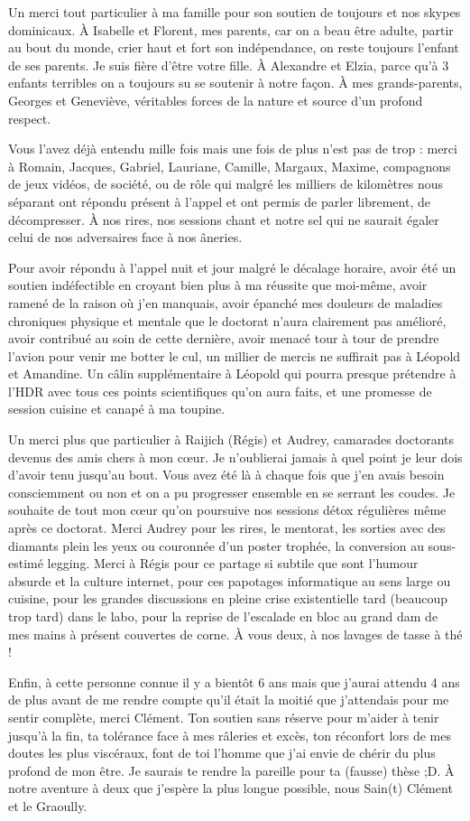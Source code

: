 Un merci tout particulier à ma famille pour son soutien de toujours et nos skypes dominicaux. À Isabelle et Florent, mes parents, car on a beau être adulte, partir au bout du monde, crier haut et fort son indépendance, on reste toujours l'enfant de ses parents. Je suis fière d'être votre fille. À Alexandre et Elzia, parce qu'à 3 enfants terribles on a toujours su se soutenir à notre façon. À mes grands-parents, Georges et Geneviève, véritables forces de la nature et source d'un profond respect.

Vous l'avez déjà entendu mille fois mais une fois de plus n'est pas de trop : merci à Romain, Jacques, Gabriel, Lauriane, Camille, Margaux, Maxime, compagnons de jeux vidéos, de société, ou de rôle qui malgré les milliers de kilomètres nous séparant ont répondu présent à l'appel et ont permis de parler librement, de décompresser. À nos rires, nos sessions chant et notre sel qui ne saurait égaler celui de nos adversaires face à nos âneries.

Pour avoir répondu à l'appel nuit et jour malgré le décalage horaire, avoir été un soutien indéfectible en croyant bien plus à ma réussite que moi-même, avoir ramené de la raison où j'en manquais, avoir épanché mes douleurs de maladies chroniques physique et mentale que le doctorat n'aura clairement pas amélioré, avoir contribué au soin de cette dernière, avoir menacé tour à tour de prendre l'avion pour venir me botter le cul, un millier de mercis ne suffirait pas à Léopold et Amandine. Un câlin supplémentaire à Léopold qui pourra presque prétendre à l'HDR avec tous ces points scientifiques qu'on aura faits, et une promesse de session cuisine et canapé à ma toupine.

Un merci plus que particulier à Raijich (Régis) et Audrey, camarades doctorants devenus des amis chers à mon cœur. Je n'oublierai jamais à quel point je leur dois d'avoir tenu jusqu'au bout. Vous avez été là à chaque fois que j'en avais besoin consciemment ou non et on a pu progresser ensemble en se serrant les coudes. Je souhaite de tout mon cœur qu'on poursuive nos sessions détox régulières même après ce doctorat. Merci Audrey pour les rires, le mentorat, les sorties avec des diamants plein les yeux ou couronnée d'un poster trophée, la conversion au sous-estimé legging. Merci à Régis pour ce partage si subtile que sont l'humour absurde et la culture internet, pour ces papotages informatique au sens large ou cuisine, pour les grandes discussions en pleine crise existentielle tard (beaucoup trop tard) dans le labo, pour la reprise de l'escalade en bloc au grand dam de mes mains à présent couvertes de corne. À vous deux, à nos lavages de tasse à thé !

Enfin, à cette personne connue il y a bientôt 6 ans mais que j'aurai attendu 4 ans de plus avant de me rendre compte qu'il était la moitié que j'attendais pour me sentir complète, merci Clément. Ton soutien sans réserve pour m'aider à tenir jusqu'à la fin, ta tolérance face à mes râleries et excès, ton réconfort lors de mes doutes les plus viscéraux, font de toi l'homme que j'ai envie de chérir du plus profond de mon être. Je saurais te rendre la pareille pour ta (fausse) thèse ;D. À notre aventure à deux que j'espère la plus longue possible, nous Sain(t) Clément et le Graoully.